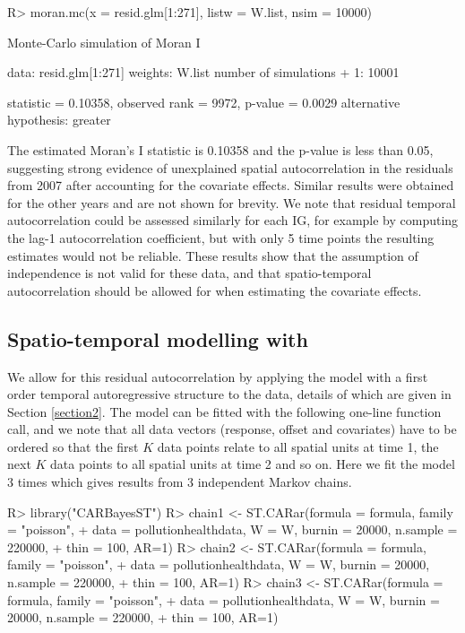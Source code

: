 \documentclass[article, nojss]{jss}
\begin{document}
\begin{Schunk}
\begin{Sinput}
R>  moran.mc(x = resid.glm[1:271], listw = W.list, nsim = 10000)
\end{Sinput}
\begin{Soutput}
	Monte-Carlo simulation of Moran I

data:  resid.glm[1:271] 
weights: W.list  
number of simulations + 1: 10001 

statistic = 0.10358, observed rank = 9972, p-value = 0.0029
alternative hypothesis: greater
\end{Soutput}
\end{Schunk}

The estimated Moran's I statistic is 0.10358 and the p-value is less than 0.05, suggesting strong evidence of unexplained spatial autocorrelation in the residuals from 2007 after accounting for the covariate effects. Similar results were obtained for the other years and are not shown for brevity. We note that residual temporal autocorrelation could be assessed similarly for each IG, for example by computing the lag-1 autocorrelation coefficient, but with only 5 time points the resulting estimates would not be reliable. These results show that the assumption of independence is not valid for these data, and that spatio-temporal autocorrelation should be allowed for when estimating the covariate effects. 


\subsection[Spatio-temporal modelling with CARBayesST]{Spatio-temporal modelling with }
We allow for this residual autocorrelation by applying the  model with a first order temporal autoregressive structure to the data, details of which are given in Section \ref{section2}. The model can be fitted with the following one-line function call, and we note that all data vectors (response, offset and covariates) have to be ordered so that the first $K$ data points relate to all spatial units at time 1, the next $K$ data points to all spatial units at time 2 and so on. Here we fit the model 3 times which gives results from 3 independent Markov chains.


\begin{CodeInput}
R>  library("CARBayesST")
R>  chain1 <- ST.CARar(formula = formula, family = "poisson", 
+       data = pollutionhealthdata, W = W, burnin = 20000, n.sample = 220000, 
+       thin = 100, AR=1)
R>  chain2 <- ST.CARar(formula = formula, family = "poisson", 
+       data = pollutionhealthdata, W = W, burnin = 20000, n.sample = 220000, 
+       thin = 100, AR=1)
R>  chain3 <- ST.CARar(formula = formula, family = "poisson", 
+       data = pollutionhealthdata, W = W, burnin = 20000, n.sample = 220000, 
+       thin = 100, AR=1)
\end{CodeInput}
\end{document}
